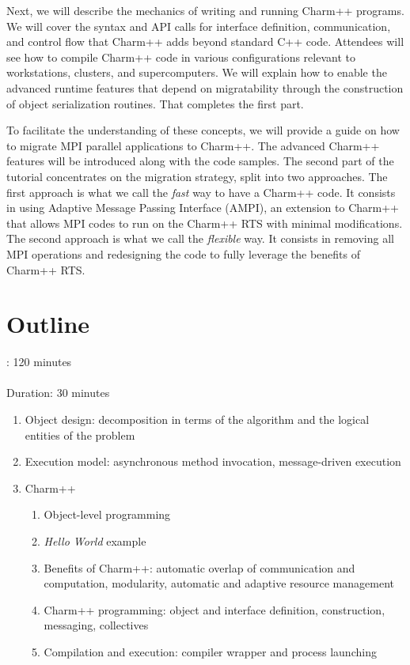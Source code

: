 \documentclass[letterpaper,10pt]{article}
\begin{document}
Next, we will describe the mechanics of writing and running Charm++
programs. We will cover the syntax and API calls for interface definition,
communication, and control flow that Charm++ adds beyond standard C++
code. Attendees will see how to compile Charm++ code in various configurations
relevant to workstations, clusters, and supercomputers. We will explain how to
enable the advanced runtime features that depend on migratability through the
construction of object serialization routines. That completes the first part.

To facilitate the understanding of these concepts, we will provide a guide on how to migrate MPI parallel applications to Charm++. The advanced Charm++ features will be introduced along with the code samples. The second part of the tutorial concentrates on the migration strategy, split into two approaches. The first approach is what we call the {\em fast} way to have a Charm++ code. It consists in using Adaptive Message Passing Interface (AMPI), an extension to Charm++ that allows MPI codes to run on the Charm++ RTS with minimal modifications. The second approach is what we call the {\em flexible} way. It consists in removing all MPI operations and redesigning the code to fully leverage the benefits of Charm++ RTS.

\newpage
\section{Outline}
: 120 minutes\\

\\
\noindent Duration: 30 minutes
\begin{enumerate}
\item Object design: decomposition in terms of the algorithm and the logical entities of the problem
\item Execution model: asynchronous method invocation, message-driven execution
\item Charm++
\begin{enumerate}
\item Object-level programming
\item {\em Hello World} example
\item Benefits of Charm++: automatic overlap of communication and computation, modularity, automatic and adaptive resource management
\item Charm++ programming: object and interface definition, construction, messaging, collectives
\item Compilation and execution: compiler wrapper and process launching
\end{enumerate}
\end{enumerate}
\end{document}
